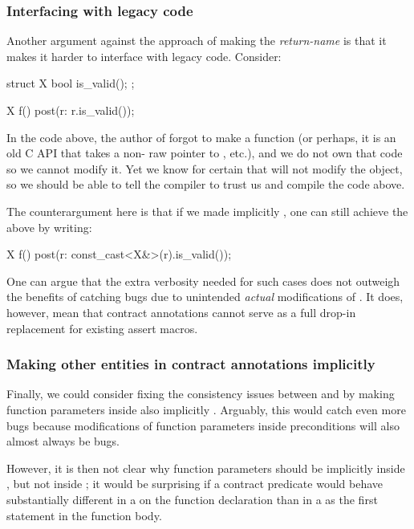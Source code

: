 \subsubsection{Interfacing with legacy code}

Another argument against the approach of making the \emph{return-name}  is that it makes it harder to interface with legacy code. Consider:

\begin{codeblock}
struct X {
  bool is_valid();
};

X f()
  post(r: r.is_valid());
\end{codeblock}

In the code above, the author of  forgot to make  a  function (or perhaps, it is an old C API that takes a non- raw pointer to , etc.), and we do not own that code so we cannot modify it. Yet we know for certain that  will not modify the object, so we should be able to tell the compiler to trust us and compile the code above.

The counterargument here is that if we made  implicitly , one can still achieve the above by writing:

 \begin{codeblock}
X f()
  post(r: const_cast<X&>(r).is_valid());
\end{codeblock}

One can argue that the extra verbosity needed for such cases does not outweigh the benefits of catching bugs due to unintended \emph{actual} modifications of . It does, however, mean that contract annotations cannot serve as a full drop-in replacement for existing assert macros.

\subsubsection{Making other entities in contract annotations implicitly }

Finally, we could consider fixing the consistency issues between  and  by making function parameters inside  also implicitly . Arguably, this would catch even more bugs because modifications of function parameters inside preconditions will also almost always be bugs.

However, it is then not clear why function parameters should be implicitly  inside , but not inside ; it would be surprising if a contract predicate would behave substantially different in a  on the function declaration than in a  as the first statement in the function body.

